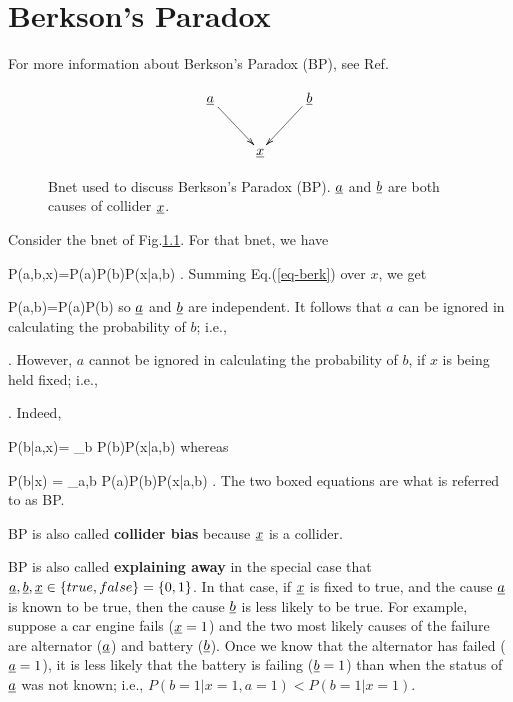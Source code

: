 \chapter{Berkson's Paradox}
\label{ch-berkson}

For more information
about Berkson's Paradox (BP), see
Ref.\cite{wiki-berkson}


\begin{figure}[h!]
$$
\xymatrix{
\rva\ar[rd]
&&\rvb\ar[ld]
\\
&\rvx
}
$$
\caption{
Bnet used to discuss Berkson's Paradox (BP).
${\underline{a}}$ and ${\underline{b}}$ are both causes of
collider
${\underline{x}}$.}
\label{fig-berkson-bnet}
\end{figure}

Consider the bnet of Fig.\ref{fig-berkson-bnet}.
For that bnet, we have

\beq
P(a,b,x)=P(a)P(b)P(x|a,b)
\;.
\label{eq-berk}
\eeq
Summing Eq.(\ref{eq-berk}) over $x$, we get

\beq
P(a,b)=P(a)P(b)
\eeq
so ${\underline{a}}$ and ${\underline{b}}$ are independent.
It follows that
$a$ can be ignored in calculating
the probability of $b$; i.e.,

\beq
{}
\;.
\eeq
However,
$a$ cannot be ignored in calculating
the probability of $b$,
if $x$ is being held fixed; i.e., 
 

\beq
{}
\;.
\eeq
Indeed,

\beq
P(b|a,x)=
{\sum_b P(b)P(x|a,b)}
\eeq
whereas

\beq
P(b|x)
=
{\sum_{a,b} P(a)P(b)P(x|a,b)}
\;.
\eeq
The two boxed 
equations are
what is referred to as BP.


BP is also called  {\bf collider bias} because 
${\underline{x}}$ is a collider.

BP is also called {\bf explaining away}
in the special case that
${\underline{a}},{\underline{b}}, {\underline{x}}\in \{true, false\}=\{0,1\}$.
In that case, if ${\underline{x}}$ is fixed
to true, and the cause
${\underline{a}}$ is known to be true, 
then the cause ${\underline{b}}$ is
less likely
to be true.
For example,
suppose a car engine fails (${\underline{x}}=1$)
and the two most likely
causes of the failure
are alternator (${\underline{a}}$)
and battery (${\underline{b}}$).
Once we know
that the alternator has failed
 (${\underline{a}}=1$), it is 
less likely that the
battery is failing (${\underline{b}}=1$)
than when the status of
${\underline{a}}$ was not known; i.e., 
$P(b=1|x=1,a=1)<P(b=1|x=1)$.



